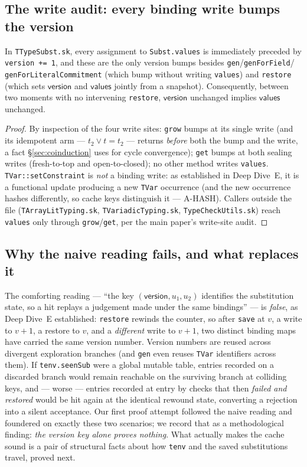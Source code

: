 \documentclass[11pt]{article}
\newcommand{\vals}{\mathsf{values}}
\newcommand{\ver}{\mathsf{version}}
\begin{document}
\subsection{The write audit: every binding write bumps the version}

\begin{lemma}
\label{lem:version}
In \texttt{TTypeSubst.sk}, every assignment to \texttt{Subst.values} is
immediately preceded by \texttt{version += 1}, and these are the only
version bumps besides \texttt{gen}/\texttt{genForField}/%
\texttt{genForLiteralCommitment} (which bump without writing
\texttt{values}) and \texttt{restore} (which sets $\ver$ and $\vals$
jointly from a snapshot). Consequently, between two moments with no
intervening \texttt{restore}, $\ver$ unchanged implies $\vals$ unchanged.
\end{lemma}
\begin{proof}
By inspection of the four write sites: \texttt{grow} bumps at its single
write (and its idempotent arm --- $t_2 \vee t = t_2$ --- returns
\emph{before} both the bump and the write, a fact
\S\ref{sec:coinduction} uses for cycle convergence); \texttt{get} bumps at
both sealing writes (fresh-to-top and open-to-closed); no other method
writes \texttt{values}. \texttt{TVar::setConstraint} is \emph{not} a
binding write: as established in Deep Dive~E, it is a functional update
producing a new \texttt{TVar} occurrence (and the new occurrence hashes
differently, so cache keys distinguish it --- A-HASH). Callers outside the
file (\texttt{TArrayLitTyping.sk}, \texttt{TVariadicTyping.sk},
\texttt{TypeCheckUtils.sk}) reach \texttt{values} only through
\texttt{grow}/\texttt{get}, per the main paper's write-site audit.
\end{proof}

\subsection{Why the naive reading fails, and what replaces it}
\label{sec:naive}

The comforting reading --- ``the key $(\ver, u_1, u_2)$ identifies the
substitution state, so a hit replays a judgement made under the same
bindings'' --- is \emph{false}, as Deep Dive~E established: \texttt{restore}
rewinds the counter, so after \texttt{save} at $v$, a write to $v{+}1$,
a restore to $v$, and a \emph{different} write to $v{+}1$, two distinct
binding maps have carried the same version number. Version numbers are
reused across divergent exploration branches (and \texttt{gen} even reuses
\texttt{TVar} identifiers across them). If \texttt{tenv.seenSub} were a
global mutable table, entries recorded on a discarded branch would remain
reachable on the surviving branch at colliding keys, and --- worse ---
entries recorded at entry by checks that then \emph{failed and restored}
would be hit again at the identical rewound state, converting a rejection
into a silent acceptance. Our first proof attempt followed the naive
reading and foundered on exactly these two scenarios; we record that as a
methodological finding: \emph{the version key alone proves nothing}. What
actually makes the cache sound is a pair of structural facts about how
\texttt{tenv} and the saved substitutions travel, proved next.
\end{document}
